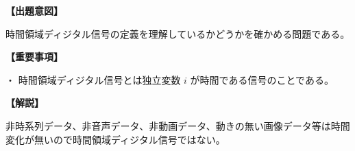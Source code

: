 \noindent \textbf{【出題意図】}

\noindent 時間領域ディジタル信号の定義を理解しているかどうかを確かめる問題である。

\vspace{1em}
\noindent \textbf{【重要事項】}

\medskip
\noindent ・ 時間領域ディジタル信号とは独立変数 $i$ が時間である信号のことである。

\vspace{1em}
\noindent \textbf{【解説】}

\noindent 非時系列データ、非音声データ、非動画データ、動きの無い画像データ等は時間変化が無いので時間領域ディジタル信号ではない。
